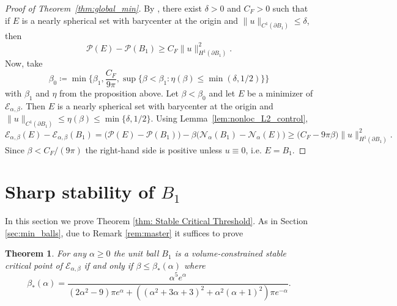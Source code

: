 \documentclass[a4paper,11pt,reqno]{amsart}
\numberwithin{equation}{section}
\newtheorem{theorem}{Theorem}[section]
\theoremstyle{remark}
\theoremstyle{definition}
\newcommand{\defeq}{\coloneqq}
\newcommand{\ene}{\mathcal{E}_{\alpha,\beta}}
\newcommand{\nl}{\mathcal{N}_{\alpha}}
\newcommand{\pt}{\partial}
\renewcommand{\leq}{\leqslant}
\renewcommand{\geq}{\geqslant}
\newcommand{\Pe}{\mathcal{P}}
\begin{document}
\begin{proof}[Proof of Theorem~\ref{thm:global_min}]
By \cite{Fug}, there exist $\delta>0$ and $C_F>0$ such that if $E$ is a nearly spherical set with barycenter at the origin and $\|u\|_{C^1(\pt B_1)}\leq \delta$, then
	\[
		\Pe(E) - \Pe(B_1) \geq C_F \|u\|_{H^1(\pt B_1)}^2.
	\]
Now, take
	\[
		\beta_0 \defeq \min \Big\{\beta_1,\frac{C_F}{9\pi},\sup\big\{\beta<\beta_1 \colon \eta(\beta)\leq \min(\delta,1/2)\big\}\Big\}
	\]
with $\beta_1$ and $\eta$ from the proposition above. Let $\beta<\beta_0$ and let $E$ be a minimizer of $\ene$. Then $E$ is a nearly spherical set with barycenter at the origin and $\|u\|_{C^1(\pt B_1)}\leq \eta(\beta)\leq \min\{\delta,1/2\}$. Using Lemma~\ref{lem:nonloc_L2_control},
	\[
		\ene(E)-\ene(B_1) = \big(\Pe(E)-\Pe(B_1)\big)-\beta\big(\nl(B_1)-\nl(E)\big)\geq \big(C_F-9\pi\beta\big)\|u\|_{H^1(\pt B_1)}^2.
	\]
Since $\beta<C_F/(9\pi)$ the right-hand side is positive unless $u\equiv 0$, i.e. $E=B_1$.
\end{proof}
 



\section{Sharp stability of \texorpdfstring{$B_1$}{B1}}\label{sec:stability}
In this section we prove Theorem \ref{thm: Stable Critical Threshold}. As in Section \ref{sec:min_balls}, due to Remark \ref{rem:master} it suffices to prove
	\begin{theorem}\label{thm: Stable Critical Threshold Beta} For any $\alpha\geq 0$ the unit ball $B_1$ is a volume-constrained stable critical point of $\ene$ if and only if $\beta \leq \beta_*(\alpha)$ where
		\begin{equation}\label{eqn:beta_star}
			\beta_*(\alpha) =\frac{\alpha^5 e^{\alpha}}{(2\alpha^2-9)\pi e^{\alpha} + \left((\alpha^2+3\alpha+3)^2+\alpha^2(\alpha+1)^2\right)\pi e^{-\alpha}}.
		\end{equation}
	\end{theorem}
	
\end{document}
